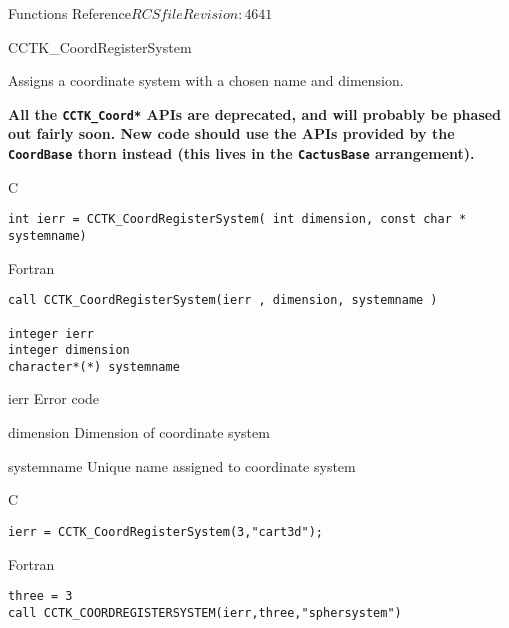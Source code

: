 \begin{cactuspart}{ Functions Reference}{$RCSfile$}{$Revision: 4641 $}

\begin{FunctionDescription}{CCTK\_CoordRegisterSystem}%
{Assigns a coordinate system with a chosen name and dimension.

\textbf{All the \texttt{CCTK\_Coord*} APIs are deprecated,
and will probably be phased out fairly soon.
New code should use the APIs provided by the \texttt{CoordBase} thorn
instead (this lives in the \texttt{CactusBase} arrangement).}
}
\label{CCTK-CoordRegisterSystem}
\begin{SynopsisSection}
\begin{Synopsis}{C}
\begin{verbatim}int ierr = CCTK_CoordRegisterSystem( int dimension, const char * systemname)\end{verbatim}
\end{Synopsis}
\begin{Synopsis}{Fortran}
\begin{verbatim}call CCTK_CoordRegisterSystem(ierr , dimension, systemname )

integer ierr
integer dimension
character*(*) systemname \end{verbatim}
\end{Synopsis}
\end{SynopsisSection}
\begin{ParameterSection}
\begin{Parameter}{ierr}
Error code
\end{Parameter}
\begin{Parameter}{dimension}
Dimension of coordinate system
\end{Parameter}
\begin{Parameter}{systemname}
Unique name assigned to coordinate system
\end{Parameter}
\end{ParameterSection}

\begin{ExampleSection}
\begin{Example}{C}
\begin{verbatim}
ierr = CCTK_CoordRegisterSystem(3,"cart3d");
\end{verbatim}
\end{Example}
\begin{Example}{Fortran}
\begin{verbatim}
three = 3
call CCTK_COORDREGISTERSYSTEM(ierr,three,"sphersystem")
\end{verbatim}
\end{Example}
\end{ExampleSection}
\end{FunctionDescription}


\end{cactuspart}
